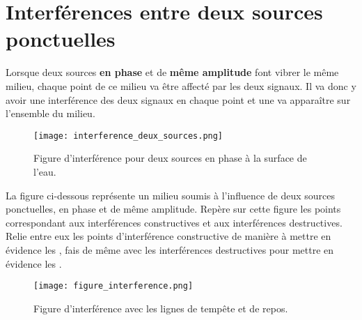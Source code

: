 \newpage

\section{Interférences entre deux sources ponctuelles}
Lorsque deux sources \textbf{en phase} et de \textbf{même amplitude} font vibrer le même milieu, chaque point de ce milieu va être affecté par les deux signaux. Il va donc y avoir une interférence des deux signaux en chaque point et une  va apparaître sur l'ensemble du milieu.

\begin{figure}[ht]
    \centering
    \texttt{[image: interference\_deux\_sources.png]}
    \caption{Figure d'interférence pour deux sources en phase à la surface de l'eau.}
\end{figure}

\newpage

La figure ci-dessous représente un milieu soumis à l'influence de deux sources ponctuelles, en phase et de même amplitude. Repère sur cette figure les points correspondant aux interférences constructives et aux interférences destructives. Relie entre eux les points d'interférence constructive de manière à mettre en évidence les , fais de même avec les interférences destructives pour mettre en évidence les .

\hfill \break


\newpage

\begin{figure}[ht]
    \centering
    \texttt{[image: figure\_interference.png]}
    \caption{Figure d'interférence avec les lignes de tempête et de repos.}
\end{figure}

